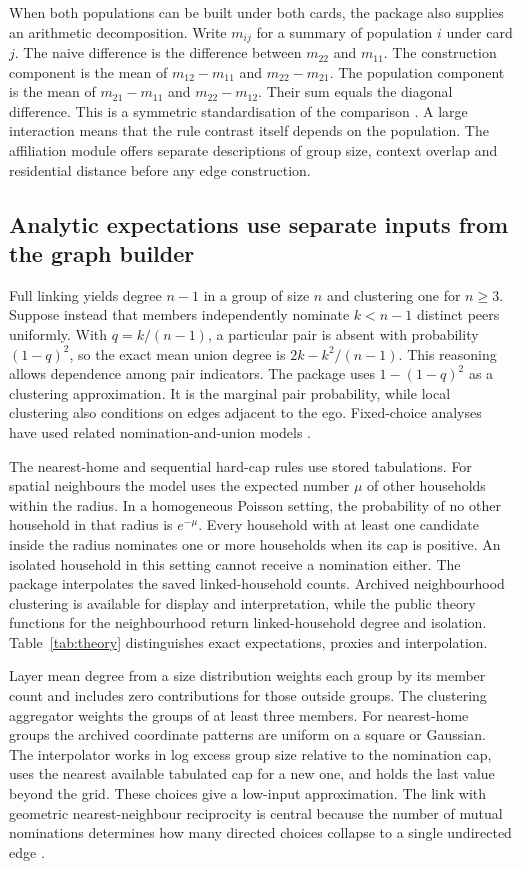 When both populations can be built under both cards, the package also supplies an arithmetic decomposition. Write $m_{ij}$ for a summary of population $i$ under card $j$. The naive difference is the difference between $m_{22}$ and $m_{11}$. The construction component is the mean of $m_{12}-m_{11}$ and $m_{22}-m_{21}$. The population component is the mean of $m_{21}-m_{11}$ and $m_{22}-m_{12}$. Their sum equals the diagonal difference. This is a symmetric standardisation of the comparison \citep{kitagawa1955,dasgupta1993,shorrocks2013}. A large interaction means that the rule contrast itself depends on the population. The affiliation module offers separate descriptions of group size, context overlap and residential distance before any edge construction.

\subsection{Analytic expectations use separate inputs from the graph builder}

Full linking yields degree $n-1$ in a group of size $n$ and clustering one for $n\geq3$. Suppose instead that members independently nominate $k<n-1$ distinct peers uniformly. With $q=k/(n-1)$, a particular pair is absent with probability $(1-q)^2$, so the exact mean union degree is $2k-k^2/(n-1)$. This reasoning allows dependence among pair indicators. The package uses $1-(1-q)^2$ as a clustering approximation. It is the marginal pair probability, while local clustering also conditions on edges adjacent to the ego. Fixed-choice analyses have used related nomination-and-union models \citep{momeni2017}.

The nearest-home and sequential hard-cap rules use stored tabulations. For spatial neighbours the model uses the expected number $\mu$ of other households within the radius. In a homogeneous Poisson setting, the probability of no other household in that radius is $e^{-\mu}$. Every household with at least one candidate inside the radius nominates one or more households when its cap is positive. An isolated household in this setting cannot receive a nomination either. The package interpolates the saved linked-household counts. Archived neighbourhood clustering is available for display and interpretation, while the public theory functions for the neighbourhood return linked-household degree and isolation. Table~\ref{tab:theory} distinguishes exact expectations, proxies and interpolation.


Layer mean degree from a size distribution weights each group by its member count and includes zero contributions for those outside groups. The clustering aggregator weights the groups of at least three members. For nearest-home groups the archived coordinate patterns are uniform on a square or Gaussian. The interpolator works in log excess group size relative to the nomination cap, uses the nearest available tabulated cap for a new one, and holds the last value beyond the grid. These choices give a low-input approximation. The link with geometric nearest-neighbour reciprocity is central because the number of mutual nominations determines how many directed choices collapse to a single undirected edge \citep{schilling1986}.

